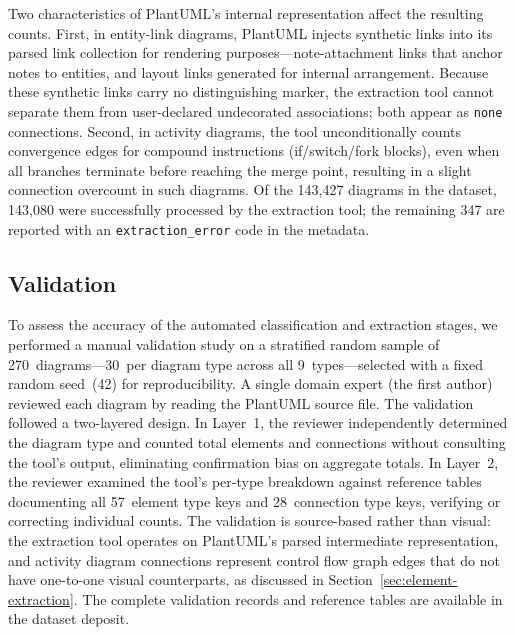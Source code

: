\documentclass[data,datadescriptor,submit,pdftex,moreauthors]{Definitions/mdpi}
\begin{document}
Two characteristics of PlantUML's internal representation affect the resulting counts. First, in entity-link diagrams, PlantUML injects synthetic links into its parsed link collection for rendering purposes---note-attachment links that anchor notes to entities, and layout links generated for internal arrangement. Because these synthetic links carry no distinguishing marker, the extraction tool cannot separate them from user-declared undecorated associations; both appear as \texttt{none} connections. Second, in activity diagrams, the tool unconditionally counts convergence edges for compound instructions (if/switch/fork blocks), even when all branches terminate before reaching the merge point, resulting in a slight connection overcount in such diagrams. Of the 143,427 diagrams in the dataset, 143,080 were successfully processed by the extraction tool; the remaining 347 are reported with an \texttt{extraction\_error} code in the metadata.

\subsection{Validation}
\label{sec:validation}

To assess the accuracy of the automated classification and extraction stages, we performed a manual validation study on a stratified random sample of 270~diagrams---30~per diagram type across all 9~types---selected with a fixed random seed~(42) for reproducibility. A single domain expert (the first author) reviewed each diagram by reading the PlantUML source file. The validation followed a two-layered design. In Layer~1, the reviewer independently determined the diagram type and counted total elements and connections without consulting the tool's output, eliminating confirmation bias on aggregate totals. In Layer~2, the reviewer examined the tool's per-type breakdown against reference tables documenting all 57~element type keys and 28~connection type keys, verifying or correcting individual counts. The validation is source-based rather than visual: the extraction tool operates on PlantUML's parsed intermediate representation, and activity diagram connections represent control flow graph edges that do not have one-to-one visual counterparts, as discussed in Section~\ref{sec:element-extraction}. The complete validation records and reference tables are available in the dataset deposit.
\end{document}
